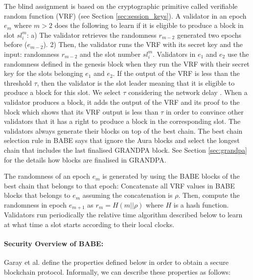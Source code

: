 The blind assignment is based on the cryptographic primitive called verifiable random function (VRF) \cite{vrf} (see Section \ref{sec:session_keys}). 
A validator in an epoch $e_m$ where $m > 2$ does the following to learn if it is eligible to produce a block in slot $sl_i^m$: a) The validator retrieves the randomness $r_{m-2}$ generated two epochs %
before ($e_{m-2}$). 2) Then, the validator runs the VRF with its secret key and the input:  randomness $r_{m-2}$ and the slot number $ sl_i^m $. Validators in $e_1$ and $e_2$ use the randomness defined in the genesis block when they run the VRF with their secret key for the slots belonging $e_1$ and $e_2$. If the output of the VRF is less than the threshold $ \tau $, then the validator is the slot leader meaning that it is eligible to produce a block for this slot. We select $\tau$ considering the network delay \cite{babe}. 
When a validator produces a block, it adds the output of the VRF and its proof to the block which shows that its VRF output is less than $\tau$  in order to convince other validators that it has a right to produce a block in the corresponding slot. The validators always generate their blocks on top of the best chain.
The best chain selection rule in BABE says that ignore the Aura blocks and select the longest chain that includes the last finalised GRANDPA block. See Section \ref{sec:grandpa} for the details how blocks are finalised in GRANDPA.

The randomness of an epoch $e_m$ is generated by using the BABE blocks of the best chain that belongs to that epoch: Concatenate all  VRF values in BABE blocks that belongs to $e_m$  assuming the concatenation is \(\rho\). Then, compute the randomness in epoch $e_{m+1}$ as $r_{m} = H(m
||\rho)$ where $ H $ is a hash function. Validators run periodically the relative time algorithm described below to learn at what time a slot starts according to their local clocks.




\paragraph{Security Overview of BABE:} Garay et al. \cite{backbone} define the properties defined below in order to obtain a secure blockchain protocol. Informally, we can describe these properties as follows:

